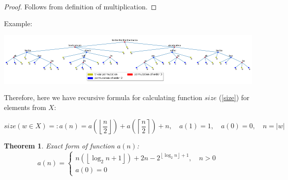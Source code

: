 \documentclass[a4paper,12pt]{amsart}
\newtheorem{theorem}{Theorem}
\begin{document}
\begin{proof}
	Follows from definition of multiplication.
\end{proof}

Example: 

\includegraphics[scale=0.5]{../graphs/max_size_tree.png}

Therefore, here we have recursive formula for calculating function $size$ (\ref{size}) for elements from $X$:

$$size(w \in X) =: a (n) = a \left(
		\left\lfloor
			\frac{n}{2}
		\right\rfloor
	\right)
	+ a \left(
			\left\lceil
				\frac{n}{2}
			\right\rceil
		\right) + n, \quad a(1) = 1, \quad a(0) = 0, \quad n = |w|
$$

\begin{theorem}
	Exact form of function $a(n)$:
	\begin{equation}
	a(n) = \begin{cases}
	n \left(\left\lfloor \log_2 n + 1 \right\rfloor\right) + 2n - 2^{\left\lfloor\log_2 n\right\rfloor + 1}, \quad n > 0 \\
	a(0) = 0
	\end{cases}
	\end{equation}
\end{theorem}
\end{document}

